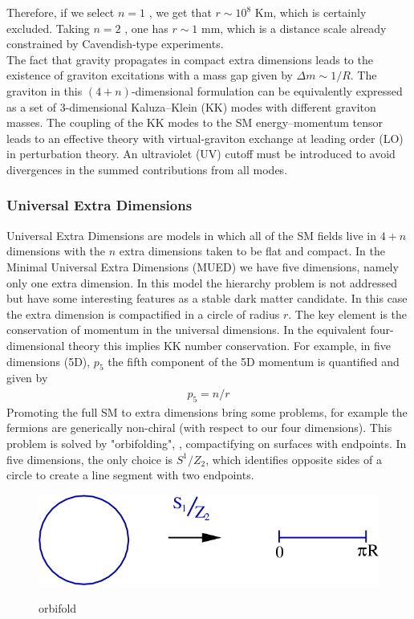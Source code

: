 Therefore, if we select $n=1$ , we get that $r\sim 10^{8}$ Km, which is certainly excluded. Taking $n=2$ , one has $r \sim 1$ mm, which is a distance scale already constrained by Cavendish-type experiments.\\
\indent
The fact that gravity propagates in compact extra dimensions leads to the existence of graviton excitations with a mass gap given by $\Delta m \sim 1/R$.
The graviton in this $(4+n)$-dimensional formulation can be equivalently expressed as a set of 3-dimensional Kaluza–Klein (KK) modes  with different graviton masses. The coupling of the KK modes to the SM energy–momentum tensor leads to an effective theory with virtual-graviton exchange at leading order (LO) in perturbation theory. An ultraviolet (UV) cutoff must be introduced to avoid divergences in the summed contributions from all modes.


\subsubsection{Universal Extra Dimensions}

Universal Extra Dimensions \cite{PhysRevD.64.035002} are models in which all of the SM fields live in $4+n$ dimensions with the $n$ extra dimensions taken to be flat and compact. 
In the Minimal Universal Extra Dimensions (MUED) we have five dimensions, namely only one extra dimension. In this model the hierarchy problem is not addressed but have some interesting features as a stable dark matter candidate.
In this case the extra dimension is compactified in a circle of radius $r$. 
The key element is the conservation of momentum in the universal dimensions. In the equivalent four-dimensional theory this implies KK number conservation. For example, in five dimensions (5D), $p_{5}$ the fifth component of the 5D momentum is quantified and given by
\begin{eqnarray}
p_{5} = n/r
\end{eqnarray}
Promoting the full SM to extra dimensions bring some problems, for example the fermions are generically non-chiral (with respect to our four dimensions). This problem is solved by "orbifolding", \ie, compactifying on surfaces with endpoints. In five dimensions, the only choice is $S^{1}/Z_{2}$, which identifies opposite sides of a circle to create a line segment with two endpoints.

\begin{figure}[H]
  \centering
\includegraphics[width=12cm]{SM_chapter_plots/orbifold}
\label{orbifigure}\caption{orbifold}
\end{figure}

